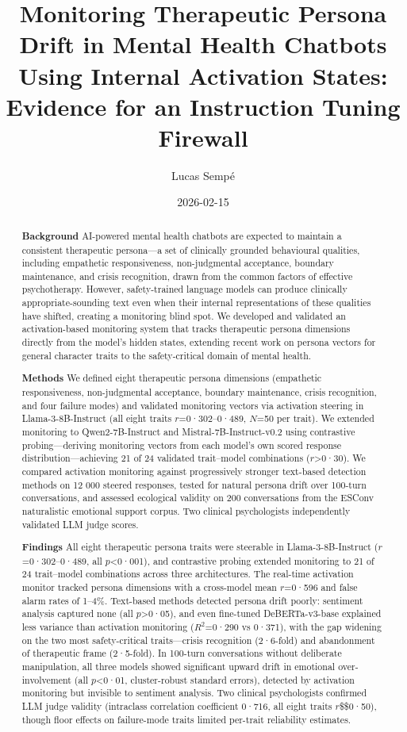 \documentclass[
  10pt,
  a4paper,
  onecolumn]{article}
\title{Monitoring Therapeutic Persona Drift in Mental Health Chatbots
Using Internal Activation States: Evidence for an Instruction Tuning
Firewall}
\author{Lucas Sempé}
\date{2026-02-15}
\begin{document}
\maketitle
\begin{abstract}
\textbf{Background} AI-powered mental health chatbots are expected to
maintain a consistent therapeutic persona---a set of clinically grounded
behavioural qualities, including empathetic responsiveness,
non-judgmental acceptance, boundary maintenance, and crisis recognition,
drawn from the common factors of effective psychotherapy. However,
safety-trained language models can produce clinically
appropriate-sounding text even when their internal representations of
these qualities have shifted, creating a monitoring blind spot. We
developed and validated an activation-based monitoring system that
tracks therapeutic persona dimensions directly from the model's hidden
states, extending recent work on persona vectors for general character
traits to the safety-critical domain of mental health.

\textbf{Methods} We defined eight therapeutic persona dimensions
(empathetic responsiveness, non-judgmental acceptance, boundary
maintenance, crisis recognition, and four failure modes) and validated
monitoring vectors via activation steering in Llama-3-8B-Instruct (all
eight traits \(r\)=0·302--0·489, \(N\)=50 per trait). We extended
monitoring to Qwen2-7B-Instruct and Mistral-7B-Instruct-v0.2 using
contrastive probing---deriving monitoring vectors from each model's own
scored response distribution---achieving 21 of 24 validated trait--model
combinations (\(r\)\textgreater0·30). We compared activation monitoring
against progressively stronger text-based detection methods on 12 000
steered responses, tested for natural persona drift over 100-turn
conversations, and assessed ecological validity on 200 conversations
from the ESConv naturalistic emotional support corpus. Two clinical
psychologists independently validated LLM judge scores.

\textbf{Findings} All eight therapeutic persona traits were steerable in
Llama-3-8B-Instruct (\(r\)=0·302--0·489, all \(p\)\textless0·001), and
contrastive probing extended monitoring to 21 of 24 trait--model
combinations across three architectures. The real-time activation
monitor tracked persona dimensions with a cross-model mean \(r\)=0·596
and false alarm rates of 1--4\%. Text-based methods detected persona
drift poorly: sentiment analysis captured none (all
\(p\)\textgreater0·05), and even fine-tuned DeBERTa-v3-base explained
less variance than activation monitoring (\(R^2\)=0·290 vs 0·371), with
the gap widening on the two most safety-critical traits---crisis
recognition (2·6-fold) and abandonment of therapeutic frame (2·5-fold).
In 100-turn conversations without deliberate manipulation, all three
models showed significant upward drift in emotional over-involvement
(all \(p\)\textless0·01, cluster-robust standard errors), detected by
activation monitoring but invisible to sentiment analysis. Two clinical
psychologists confirmed LLM judge validity (intraclass correlation
coefficient 0·716, all eight traits \(r\)\$\geq\$0·50), though floor
effects on failure-mode traits limited per-trait reliability estimates.


\end{abstract}
\end{document}
